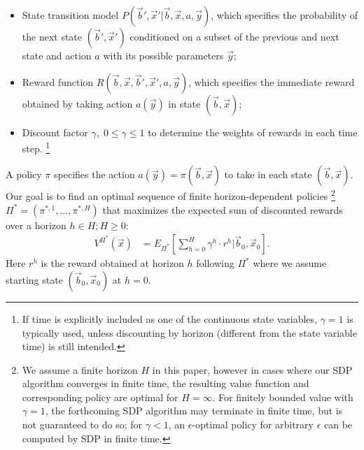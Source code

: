 \documentclass[twoside,11pt]{article}
\begin{document}
\begin{itemize}
\item State transition model $P(\vec{b}',\vec{x}'|\vec{b},\vec{x},a,\vec{y})$, which specifies the
probability of the next state $(\vec{b}',\vec{x}')$ conditioned on a
subset of the previous and next state and action $a$ with its possible parameters $\vec{y}$; 

\item Reward function $R(\vec{b},\vec{x},\vec{b}',\vec{x}',a,\vec{y})$, which specifies the immediate reward obtained by taking action $a(\vec{y})$ in state $(\vec{b},\vec{x})$; 

\item Discount factor $\gamma, \; 0 \leq \gamma \leq 1$ to determine the weights of rewards in each time step.
\footnote{If time is explicitly included as one of the
continuous state variables, $\gamma = 1$ is typically used, unless
discounting by horizon (different from the state variable time) is
still intended.}  
\end{itemize}

A policy $\pi$ specifies the action $a(\vec{y}) =\pi(\vec{b},\vec{x})$ to take in each state $(\vec{b},\vec{x})$.  Our
goal is to find an optimal sequence of finite horizon-dependent
policies
\footnote{We assume a finite horizon $H$ in this
paper, however in cases where our SDP algorithm converges
in finite time, the resulting value function and 
corresponding policy are optimal for $H=\infty$. 
For finitely bounded value
with $\gamma = 1$, the forthcoming SDP algorithm may terminate in
finite time, but is not guaranteed to do so; for $\gamma < 1$, an
$\epsilon$-optimal policy for arbitrary $\epsilon$ can be computed by
SDP in finite time.
} 
$\Pi^* = (\pi^{*,1},\ldots,\pi^{*,H})$ that
maximizes the expected sum of discounted rewards over a horizon $h \in H; H \geq 0$:
\begin{align}
V^{\Pi^*}(\vec{x}) & = E_{\Pi^*} \left[ \sum_{h=0}^{H} \gamma^h \cdot r^h \Big| \vec{b}_0,\vec{x}_0 \right]. \label{eq:vfun_def}
\end{align}
Here $r^h$ is the reward obtained at horizon $h$ following $\Pi^*$ where 
we assume starting state $(\vec{b}_0,\vec{x}_0)$ at $h=0$.
\end{document}
